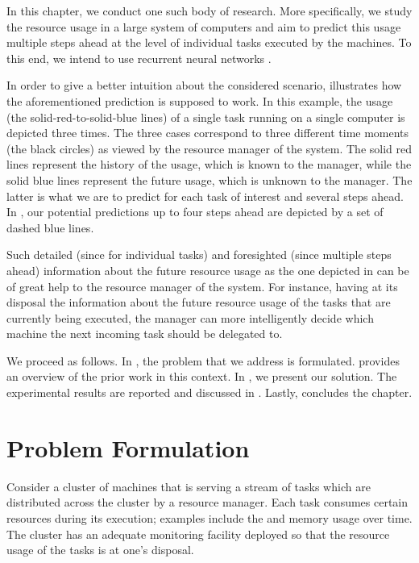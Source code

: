 In this chapter, we conduct one such body of research. More specifically, we
study the resource usage in a large system of computers and aim to predict this
usage multiple steps ahead at the level of individual tasks executed by the
machines. To this end, we intend to use recurrent neural networks
\cite{goodfellow2016}.

In order to give a better intuition about the considered scenario,
 illustrates how the aforementioned prediction is supposed
to work. In this example, the  usage (the solid-red-to-solid-blue lines)
of a single task running on a single computer is depicted three times. The three
cases correspond to three different time moments (the black circles) as viewed
by the resource manager of the system. The solid red lines represent the history
of the usage, which is known to the manager, while the solid blue lines
represent the future usage, which is unknown to the manager. The latter is what
we are to predict for each task of interest and several steps ahead. In
, our potential predictions up to four steps ahead are
depicted by a set of dashed blue lines.

Such detailed (since for individual tasks) and foresighted (since multiple steps
ahead) information about the future resource usage as the one depicted in
 can be of great help to the resource manager of the
system. For instance, having at its disposal the information about the future
resource usage of the tasks that are currently being executed, the manager can
more intelligently decide which machine the next incoming task should be
delegated to.

We proceed as follows. In , the problem that we address is
formulated.  provides an overview of the prior work in this
context. In , we present our solution. The experimental
results are reported and discussed in . Lastly,
 concludes the chapter.

\section{Problem Formulation}

Consider a cluster of machines that is serving a stream of tasks which are
distributed across the cluster by a resource manager. Each task consumes certain
resources during its execution; examples include the  and memory usage
over time. The cluster has an adequate monitoring facility deployed so that the
resource usage of the tasks is at one's disposal.

